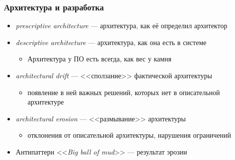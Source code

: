 \documentclass[xetex,mathserif,serif]{beamer}
\begin{document}
	\begin{frame}
		\frametitle{Архитектура и разработка}
		\begin{itemize}
			\item \emph{prescriptive architecture} --- архитектура, как её определил архитектор
			\item \emph{descriptive architecture} --- архитектура, как она есть в системе
			\begin{itemize}
				\item Архитектура у ПО есть всегда, как вес у камня
			\end{itemize}
			\item \emph{architectural drift} --- <<сползание>> фактической архитектуры
			\begin{itemize}
				\item появление в ней важных решений, которых нет в описательной архитектуре
			\end{itemize}
			\item \emph{architectural erosion} --- <<размывание>> архитектуры
			\begin{itemize}
				\item отклонения от описательной архитектуры, нарушения ограничений
			\end{itemize}
			\item Антипаттерн <<\emph{Big ball of mud}>> --- результат эрозии
		\end{itemize}
	\end{frame}
\end{document}

